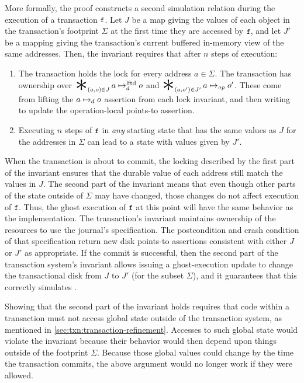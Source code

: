 More formally, the proof constructs a second simulation relation during the
execution of a transaction $\cc{f}$.  Let $J$ be a map giving the values of each
object in the transaction's footprint $\Sigma$ at the first time they are
accessed by $\cc{f}$, and let $J'$ be a mapping giving the transaction's current
buffered in-memory view of the same addresses.  Then, the invariant requires
that after $n$ steps of execution:
%
\begin{enumerate}

\item The transaction holds the lock for every address $a \in \Sigma$. The
transaction has ownership over $\bigast_{(a,o) \in J} a \mapstoLftd o$ and
$\bigast_{(a,o') \in J'} a \mapstoOp o'$. These come from lifting the
$a \mapsto_d o$ assertion from each lock invariant, and then writing to update
the operation-local points-to assertion.

\item Executing $n$ steps of $\cc{f}$ in \emph{any} starting state that has the same
  values as $J$ for the addresses in $\Sigma$ can lead to a state with values given
  by $J'$.

\end{enumerate}
%
When the transaction is about to commit, the locking described by the first part of the
invariant ensures that the durable value of each address still match the values
in $J$. The second part of the invariant means that even though other
parts of the state outside of $\Sigma$ may have changed, those changes do not
affect execution of $\cc{f}$. Thus, the ghost execution of $\cc{f}$ at this point will
have the same behavior as the implementation. The transaction's invariant
maintains ownership of the resources to use the journal's 
specification. The postcondition and crash condition of that specification
return new disk points-to assertions consistent with either $J$ or $J'$ as
appropriate. If the commit is successful, then the second part of the
transaction system's invariant allows issuing a ghost-execution update to change
the transactional disk from $J$ to $J'$ (for the subset $\Sigma$), and it
guarantees that this correctly simulates .

Showing that the second part of the invariant holds requires that code within a
transaction must not access global state outside of the
transaction system, as mentioned in \cref{sec:txn:transaction-refinement}. Accesses to such global state
would violate the invariant because their behavior would then depend upon
things outside of the footprint $\Sigma$. Because those global values could change
by the time the transaction commits, the above argument would no longer work if they were allowed.

